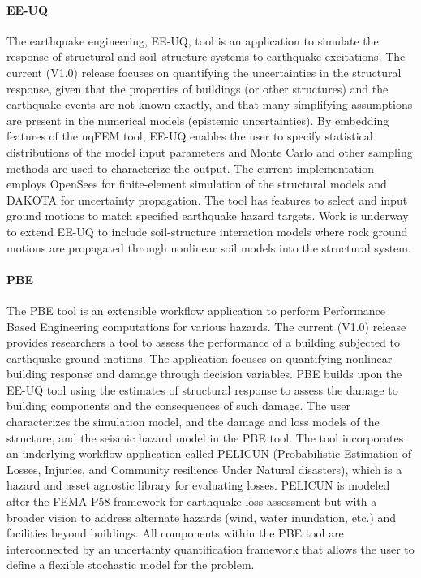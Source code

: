 \paragraph{EE-UQ} The earthquake engineering, EE-UQ, tool is an application to simulate the response of structural and soil–structure systems to earthquake excitations. The current (V1.0) release focuses on quantifying the uncertainties in the structural response, given that the properties of buildings (or other structures) and the earthquake events are not known exactly, and that many simplifying assumptions are present in the numerical models (epistemic uncertainties). By embedding features of the uqFEM tool, EE-UQ enables the user to specify statistical distributions of the model input parameters and Monte Carlo and other sampling methods are used to characterize the output. The current implementation employs OpenSees for finite-element simulation of the structural models and DAKOTA for uncertainty propagation. The tool has features to select and input ground motions to match specified earthquake hazard targets. Work is underway to extend EE-UQ to include soil-structure interaction models where rock ground motions are propagated through nonlinear soil models into the structural system.

\paragraph{PBE} The PBE tool is an extensible workflow application to perform Performance Based Engineering computations for various hazards. The current (V1.0) release provides researchers a tool to assess the performance of a building subjected to earthquake ground motions. The application focuses on quantifying nonlinear building response and damage through decision variables. PBE builds upon the EE-UQ tool using the estimates of structural response to assess the damage to building components and the consequences of such damage. The user characterizes the simulation model, and the damage and loss models of the structure, and the seismic hazard model in the PBE tool. The tool incorporates an underlying workflow application called PELICUN (Probabilistic Estimation of Losses, Injuries, and Community resilience Under Natural disasters), which is a hazard and asset agnostic library for evaluating losses. PELICUN is modeled after the FEMA P58 framework for earthquake loss assessment but with a broader vision to address alternate hazards (wind, water inundation, etc.) and facilities beyond buildings. All components within the PBE tool are interconnected by an uncertainty quantification framework that allows the user to define a flexible stochastic model for the problem.

